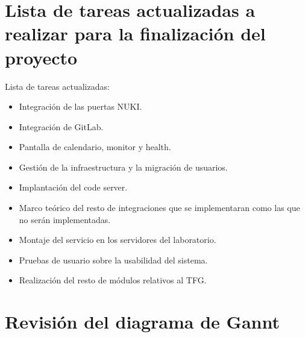 \section{Lista de tareas actualizadas a realizar para la finalización del proyecto}
Lista de tareas actualizadas: 

\begin{itemize}
    \item Integración de las puertas NUKI.
    \item Integración de GitLab.
    \item Pantalla de calendario, monitor y health.
    \item Gestión de la infraestructura y la migración de usuarios. 
    \item Implantación del code server.
    \item Marco teórico del resto de integraciones que se implementaran como las que no serán implementadas.
    \item Montaje del servicio en los servidores del laboratorio. 
    \item Pruebas de usuario sobre la usabilidad del sistema. 
    \item Realización del resto de módulos relativos al TFG.
\end{itemize}


\section{Revisión del diagrama de Gannt}



